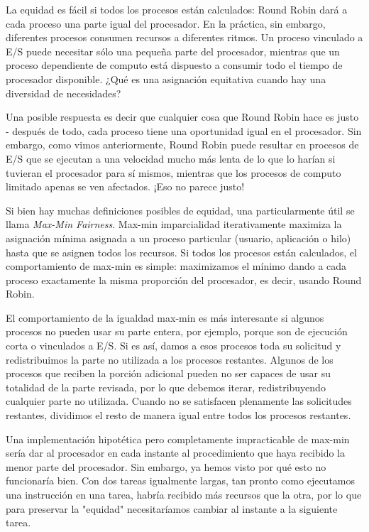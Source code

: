 \documentclass[10pt]{book}
\begin{document}
La equidad es fácil si todos los procesos están calculados: Round Robin dará a cada proceso una parte igual del procesador. En la práctica, sin embargo, diferentes procesos consumen recursos a diferentes ritmos. Un proceso vinculado a E/S puede necesitar sólo una pequeña parte del procesador, mientras que un proceso dependiente de computo está dispuesto a consumir todo el tiempo de procesador disponible. ¿Qué es una asignación equitativa cuando hay una diversidad de necesidades?

Una posible respuesta es decir que cualquier cosa que Round Robin hace es justo - después de todo, cada proceso tiene una oportunidad igual en el procesador. Sin embargo, como vimos anteriormente, Round Robin puede resultar en procesos de E/S que se ejecutan a una velocidad mucho más lenta de lo que lo harían si tuvieran el procesador para sí mismos, mientras que los procesos de computo limitado apenas se ven afectados. ¡Eso no parece justo!

Si bien hay muchas definiciones posibles de equidad, una particularmente útil se llama \textit{Max-Min Fairness}. Max-min imparcialidad iterativamente maximiza la asignación mínima asignada a un proceso particular (usuario, aplicación o hilo) hasta que se asignen todos los recursos. Si todos los procesos están calculados, el comportamiento de max-min es simple: maximizamos el mínimo dando a cada proceso exactamente la misma proporción del procesador, es decir, usando Round Robin.

El comportamiento de la igualdad max-min es más interesante si algunos procesos no pueden usar su parte entera, por ejemplo, porque son de ejecución corta o vinculados a E/S. Si es así, damos a esos procesos toda su solicitud y redistribuimos la parte no utilizada a los procesos restantes. Algunos de los procesos que reciben la porción adicional pueden no ser capaces de usar su totalidad de la parte revisada, por lo que debemos iterar, redistribuyendo cualquier parte no utilizada. Cuando no se satisfacen plenamente las solicitudes restantes, dividimos el resto de manera igual entre todos los procesos restantes.

Una implementación hipotética pero completamente impracticable de max-min sería dar al procesador en cada instante al procedimiento que haya recibido la menor parte del procesador. Sin embargo, ya hemos visto por qué esto no funcionaría bien. Con dos tareas igualmente largas, tan pronto como ejecutamos una instrucción en una tarea, habría recibido más recursos que la otra, por lo que para preservar la "equidad" necesitaríamos cambiar al instante a la siguiente tarea.
\end{document}
